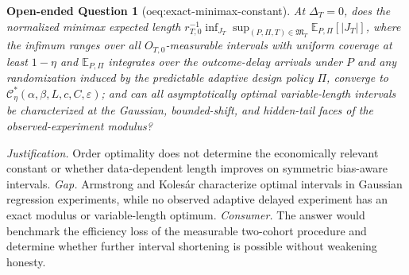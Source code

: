 \documentclass{article}
\newtheorem{openendedquestion}{Open-ended Question}
\begin{document}
\begin{openendedquestion}[oeq:exact-minimax-constant]\label{oeq:exact-minimax-constant}
At \(\Delta_T=0\), does the normalized minimax expected length \(r_{T,0}^{-1}\inf_{J_T}\sup_{(P,\Pi,T)\in\mathfrak M_T}\mathbb E_{P,\Pi}[|J_T|]\), where the infimum ranges over all \(O_{T,0}\)-measurable intervals with uniform coverage at least \(1-\eta\) and \(\mathbb E_{P,\Pi}\) integrates over the outcome-delay arrivals under \(P\) and any randomization induced by the predictable adaptive design policy \(\Pi\), converge to \(\mathcal C_\eta^*(\alpha,\beta,L,c,C,\varepsilon)\); and can all asymptotically optimal variable-length intervals be characterized at the Gaussian, bounded-shift, and hidden-tail faces of the observed-experiment modulus?
\end{openendedquestion}
\par\smallskip\noindent \textit{Justification.} Order optimality does not determine the economically relevant constant or whether data-dependent length improves on symmetric bias-aware intervals. \textit{Gap.} Armstrong and Kolesár characterize optimal intervals in Gaussian regression experiments, while no observed adaptive delayed experiment has an exact modulus or variable-length optimum. \textit{Consumer.} The answer would benchmark the efficiency loss of the measurable two-cohort procedure and determine whether further interval shortening is possible without weakening honesty.
\end{document}
